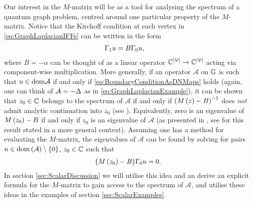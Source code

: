 Our interest in the $M$-matrix will be as a tool for analysing the spectrum of a quantum graph problem, centred around one particular property of the $M$-matrix.
Notice that the Kirchoff condition at each vertex in \eqref{eq:GraphLaplacianIFFs} can be written in the form
\begin{align} \label{eq:BoundaryConditionAsDNMaps}
	\Gamma_1 u &= B\Gamma_0 u,
\end{align}
where $B = -\alpha$ can be thought of as a linear operator $\mathbb{C}^{\left\lvert \mathcal{V} \right\rvert}\rightarrow\mathbb{C}^{\left\lvert \mathcal{V} \right\rvert}$ acting via component-wise multiplication.
More generally, if an operator $\mathcal{A}$ on $\mathbb{G}$ is such that $u\in\mathrm{dom}\mathcal{A}$ if and only if \eqref{eq:BoundaryConditionAsDNMaps} holds (again, one can think of $\mathcal{A}=-\Delta$ as in \eqref{eq:GraphLaplacianExample}), it can be shown that $z_0\in\mathbb{C}$ belongs to the spectrum of $\mathcal{A}$ if and only if $\left( M\left( z \right) - B \right)^{-1}$ does \emph{not} admit analytic continuation into $z_0$ (see \cite[Theorem 2.1]{ershova2014isospectrality}).
Equivalently, zero is an eigenvalue of $M\left( z_0 \right)-B$ if and only if $z_0$ is an eigenvalue of $\mathcal{A}$ (as presented in \cite[page 698]{cherednichenko2019time}, see \cite[Proposition 1]{derkach1991generalized} for this result stated in a more general context).
Assuming one has a method for evaluating the $M$-matrix, the eigenvalues of $\mathcal{A}$ can be found by solving for pairs $u\in\mathrm{dom}\left( \mathcal{A} \right)\setminus\left\{ 0 \right\}$, $z_0\in\mathbb{C}$ such that
\begin{align*}
	\bigl( M\left( z_0 \right) - B \bigr) \Gamma_0 u = 0.
\end{align*}
In section \ref{sec:ScalarDiscussion} we will utilise this idea and an derive an explicit formula for the $M$-matrix to gain access to the spectrum of $\mathcal{A}$, and utilise these ideas in the examples of section \ref{sec:ScalarExamples}.

